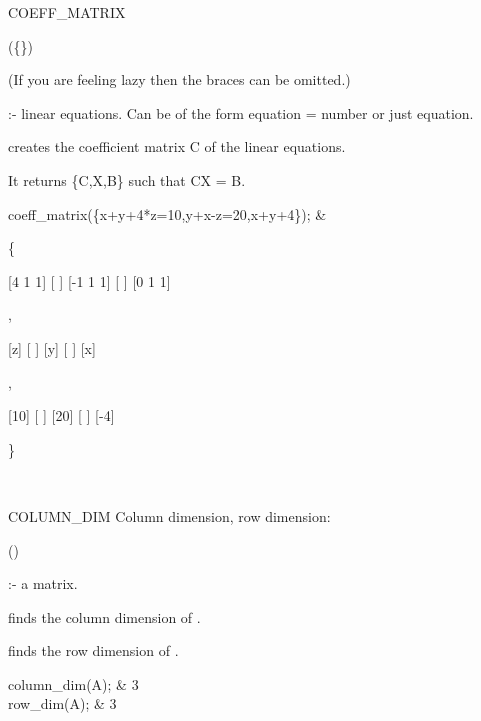 \begin{Operator}[coeffmatrix]{COEFF_MATRIX}

\begin{Syntax}
(\{\}) 
\end{Syntax}

(If you are feeling lazy then the braces can be omitted.)

  :- linear equations. Can be of the form equation = number
or just equation.

 creates the coefficient matrix C of the linear 
equations. 

It returns \{C,X,B\} such that CX = B.

\begin{Examples}

coeff_matrix(\{x+y+4*z=10,y+x-z=20,x+y+4\}); &
\begin{multilineoutput}{6cm}
\{

 [4   1  1]
 [        ]
 [-1  1  1]
 [        ]
 [0   1  1]

 ,

 [z]
 [ ]
 [y]
 [ ]
 [x]

 ,

 [10]
 [  ]
 [20]
 [  ]
 [-4]

\}
\end{multilineoutput} \\

\end{Examples}

\end{Operator}


\begin{Operator}[columndim]{COLUMN_DIM}
Column dimension, row dimension:

\begin{Syntax}
()
\end{Syntax}

 :- a matrix.

 finds the column dimension of . 

 finds the row dimension of .


\begin{Examples}

column_dim(A); &
3 \\
row_dim(A); &
3 \\

\end{Examples}

\end{Operator}



